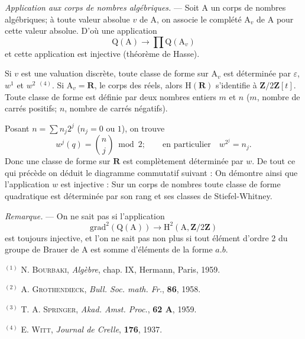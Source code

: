 \textit{Application aux corps de nombres algébriques.} --- Soit $\mathrm A$ un corps de
nombres algébriques; à toute valeur absolue $v$ de $\mathrm A$, on associe le
complété $\mathrm A_v$ de $\mathrm A$ pour cette valeur absolue. D'où une application
\[
\mathrm Q(\mathrm A)\to\prod\mathrm Q(\mathrm A_v)
\]
et cette application est injective (théorème de Hasse).

Si $v$ est une valuation discrète, toute classe de forme sur $\mathrm A_v$
est déterminée par $\varepsilon$, $w^1$ et $w^2$ $^{(4)}$.
Si $\mathrm A_v=\mathbf R$, le corps des réels, alors $\mathrm H(\mathbf R)$
s'identifie à $\mathbf Z/2\mathbf Z[t]$. Toute classe de forme est définie par
deux nombres entiers $m$ et $n$ ($m$, nombre de carrés positifs; $n$, nombre de
carrés négatifs).

Posant $n=\sum n_j2^j$ ($n_j=0$ ou $1$), on trouve
\[
w^j(q)=\binom nj\bmod 2;\qquad\text{en particulier}\quad w^{2^j}=n_j.
\]
Donc une classe de forme sur $\mathbf R$ est complètement déterminée par $w$.
De tout ce qui précède on déduit le diagramme commutatif suivant :
On démontre ainsi que l'application $w$ est injective : Sur un corps de
nombres toute classe de forme quadratique est déterminée par son rang et ses
classes de Stiefel-Whitney.

\textit{Remarque.} --- On ne sait pas si l'application
\[
\mathrm{grad}^2(\mathrm Q(\mathrm A))\to\mathrm H^2(\mathrm A,\mathbf Z/2\mathbf Z)
\]
est toujours injective, et l'on ne sait pas non plus si tout élément d'ordre 2
du groupe de Brauer de $\mathrm A$ est somme d'éléments de la forme $a.b$.

$^{(1)}$ N. \textsc{Bourbaki}, \textit{Algèbre}, chap. IX, Hermann, Paris, 1959.

$^{(2)}$ A. \textsc{Grothendieck}, \textit{Bull. Soc. math. Fr.}, \textbf{86}, 1958.

$^{(3)}$ T. A. \textsc{Springer}, \textit{Akad. Amst. Proc.}, \textbf{62 A}, 1959.

$^{(4)}$ E. \textsc{Witt}, \textit{Journal de Crelle}, \textbf{176}, 1937.
